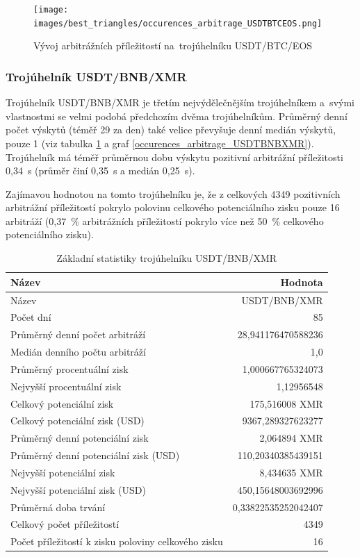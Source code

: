 \documentclass[thesis=B,czech]{FITthesis}[2019/03/21]
\begin{document}
\begin{figure}\centering
	\texttt{[image: images/best\_triangles/occurences\_arbitrage\_USDTBTCEOS.png]}
	\caption{Vývoj arbitrážních příležitostí na~trojúhelníku USDT/BTC/EOS }\label{occurences_arbitrage_USDTBTCEOS}
\end{figure}

\subsubsection{Trojúhelník USDT/BNB/XMR}
Trojúhelník USDT/BNB/XMR je třetím nejvýdělečnějším trojúhelníkem \linebreak a~svými vlastnostmi se velmi podobá předchozím dvěma trojúhelníkům. Průměrný denní počet výskytů (téměř 29 za den) také velice převyšuje denní medián výskytů, pouze 1 (viz tabulka \ref{USDTBNBXMR_stats} a graf \ref{occurences_arbitrage_USDTBNBXMR}). Trojúhelník má \linebreak téměř průměrnou dobu výskytu pozitivní arbitrážní příležitosti 0,34~s (průměr činí 0,35~s a medián 0,25~s).

Zajímavou hodnotou na tomto trojúhelníku je, že z celkových 4349 pozitivních arbitrážní příležitostí pokrylo polovinu celkového potenciálního zisku pouze 16 arbitráží (0,37~\% arbitrážních příležitostí pokrylo více než 50~\% celkového potenciálního zisku).

\begin{table}\centering
\caption{Základní statistiky trojúhelníku USDT/BNB/XMR}
\label{USDTBNBXMR_stats}
\begin{tabular}{|| l | r ||}
\hline Název & Hodnota \\ 
\hline\hline Název & USDT/BNB/XMR \\ 
\hline Počet dní & 85 \\ 
\hline Průměrný denní počet arbitráží & 28,941176470588236 \\ 
\hline Medián denního počtu arbitráží & 1,0 \\ 
\hline Průměrný procentuální zisk & 1,000667765324073 \\ 
\hline Nejvyšší procentuální zisk & 1,12956548 \\ 
\hline Celkový potenciální zisk & 175,516008 XMR \\ 
\hline Celkový potenciální zisk (USD) & 9367,289327623277 \\ 
\hline Průměrný denní potenciální zisk & 2,064894 XMR \\ 
\hline Průměrný denní potenciální zisk (USD) & 110,20340385439151 \\ 
\hline Nejvyšší potenciální zisk & 8,434635 XMR \\ 
\hline Nejvyšší potenciální zisk (USD) & 450,15648003692996 \\ 
\hline Průměrná doba trvání & 0,33822535252042407 \\ 
\hline Celkový počet příležitostí & 4349 \\ 
\hline Počet příležitostí k zisku poloviny celkového zisku & 16 \\ 
\hline
\end{tabular}
\end{table}
\end{document}
